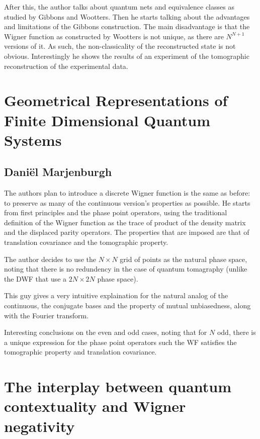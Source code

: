 \documentclass[a4paper]{article}
\begin{document}
  After this, the author talks about quantum nets and
  equivalence classes as studied by Gibbons and Wootters.
  Then he starts talking about the advantages and
  limitations of the Gibbons construction. The main
  disadvantage is that the Wigner function as constructed by
  Wootters is not unique, as there are $N^{N+1}$ versions of
  it. As such, the non-classicality of the reconstructed
  state is not obvious. Interestingly he shows the results
  of an experiment of the tomographic reconstruction of the
  experimental data.

  \section{Geometrical Representations of Finite Dimensional
  Quantum Systems}

  \subsection{Daniël Marjenburgh}

  The authors plan to introduce a discrete Wigner function
  is the same as before: to preserve as many of the
  continuous version's properties as possible. He starts
  from first principles and the phase point operators, using
  the traditional definition of the Wigner function as the
  trace of product of the density matrix and the displaced
  parity operators. The properties that are imposed are that
  of translation covariance and the tomographic property.

  The author decides to use the $N \times N$ grid of points
  as the natural phase space, noting that there is no
  redundency in the case of quantum tomagraphy (unlike the
  DWF that use a $2N \times 2N$ phase space).

  This guy gives a very intuitive explaination for the
  natural analog of the continuous, the conjugate bases and
  the property of mutual unbiasedness, along with the
  Fourier transform.

  Interesting conclusions on the even and odd cases, noting
  that for $N$ odd, there is a unique expression for the
  phase point operators such the WF satisfies the
  tomographic property and translation covariance.

  \section{The interplay between quantum contextuality and
    Wigner negativity}
  
\end{document}
